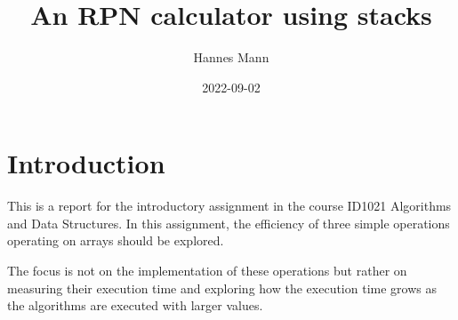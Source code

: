 \documentclass[a4paper,11pt]{article}
\begin{document}
\title{
    \textbf{An RPN calculator using stacks}
}
\author{Hannes Mann}
\date{2022-09-02}

\maketitle

\section*{Introduction}

This is a report for the introductory assignment in the course ID1021 Algorithms and Data Structures. In this assignment, the efficiency of three simple operations operating on arrays should be explored.

The focus is not on the implementation of these operations but rather on measuring their execution time and exploring how the execution time grows as the algorithms are executed with larger values.
\end{document}
